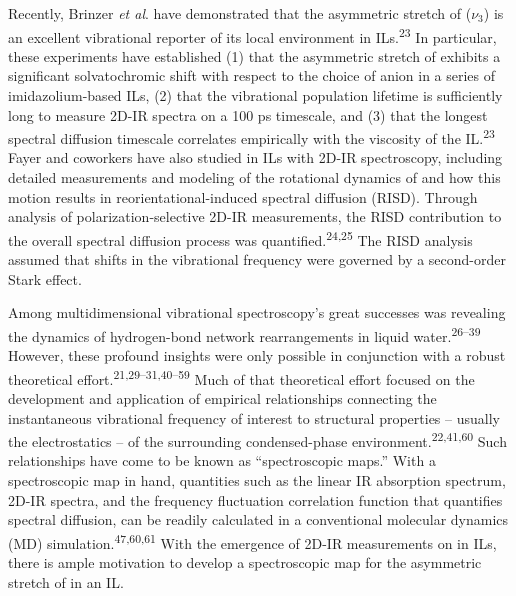 \documentclass[]{article}
\begin{document}
Recently, Brinzer \emph{et al}. have demonstrated that the asymmetric stretch of  (\(\nu_3\)) is an excellent vibrational reporter of its local environment in ILs.\textsuperscript{23} In particular, these experiments have established (1) that the asymmetric stretch of  exhibits a significant solvatochromic shift with respect to the choice of anion in a series of imidazolium-based ILs, (2) that the  vibrational population lifetime is sufficiently long to measure 2D-IR spectra on a 100 ps timescale, and (3) that the longest spectral diffusion timescale correlates empirically with the viscosity of the IL.\textsuperscript{23} Fayer and coworkers have also studied  in ILs with 2D-IR spectroscopy, including detailed measurements and modeling of the rotational dynamics of  and how this motion results in reorientational-induced spectral diffusion (RISD). Through analysis of polarization-selective 2D-IR measurements, the RISD contribution to the overall spectral diffusion process was quantified.\textsuperscript{24,25} The RISD analysis assumed that shifts in the  vibrational frequency were governed by a second-order Stark effect.

Among multidimensional vibrational spectroscopy's great successes was revealing the dynamics of hydrogen-bond network rearrangements in liquid water.\textsuperscript{26--39} However, these profound insights were only possible in conjunction with a robust theoretical effort.\textsuperscript{21,29--31,40--59} Much of that theoretical effort focused on the development and application of empirical relationships connecting the instantaneous vibrational frequency of interest to structural properties -- usually the electrostatics -- of the surrounding condensed-phase environment.\textsuperscript{22,41,60} Such relationships have come to be known as ``spectroscopic maps.'' With a spectroscopic map in hand, quantities such as the linear IR absorption spectrum, 2D-IR spectra, and the frequency fluctuation correlation function that quantifies spectral diffusion, can be readily calculated in a conventional molecular dynamics (MD) simulation.\textsuperscript{47,60,61} With the emergence of 2D-IR measurements on  in ILs, there is ample motivation to develop a spectroscopic map for the asymmetric stretch of  in an IL.
\end{document}
